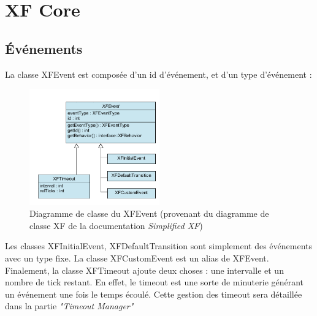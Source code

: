 \section{XF Core}
\subsection{Événements}
La classe XFEvent est composée d'un id d'événement, et d'un type d'événement :
\begin{figure}[H]
    \centering
    \includegraphics[width=0.5\textwidth]{Images/xf/xfevent.PNG}
    \caption[Diagramme de classe du XFEvent]{Diagramme de classe du XFEvent (provenant du diagramme
        de classe XF de la documentation \emph{Simplified XF}\footnotemark[1])}
\end{figure}
Les classes XFInitialEvent, XFDefaultTransition sont simplement des événements avec un type
fixe. La classe XFCustomEvent est un alias de XFEvent. Finalement, la classe XFTimeout ajoute
deux choses : une intervalle et un nombre de tick restant. En effet, le timeout est une
sorte de minuterie générant un événement une fois le temps écoulé. Cette gestion des timeout
sera détaillée dans la partie \emph{"Timeout Manager"}\newpage

